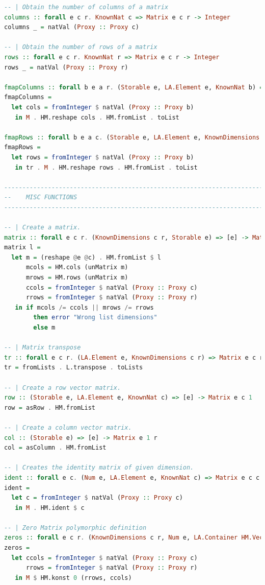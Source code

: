 \documentclass[
  oneside,
  11pt, a4paper,
  footinclude=true,
  headinclude=true,
  cleardoublepage=empty
]{scrbook}
\theoremstyle{definition}
\theoremstyle{definition}
\begin{document}
\begin{lstlisting}[language=Haskell, caption={Type safe matrix wrapper library},captionpos=b]
-- | Obtain the number of columns of a matrix
columns :: forall e c r. KnownNat c => Matrix e c r -> Integer
columns _ = natVal (Proxy :: Proxy c)

-- | Obtain the number of rows of a matrix
rows :: forall e c r. KnownNat r => Matrix e c r -> Integer
rows _ = natVal (Proxy :: Proxy r)

fmapColumns :: forall b e a r. (Storable e, LA.Element e, KnownNat b) => Matrix e a r -> Matrix e b r
fmapColumns =
  let cols = fromInteger $ natVal (Proxy :: Proxy b)
   in M . HM.reshape cols . HM.fromList . toList

fmapRows :: forall b e a c. (Storable e, LA.Element e, KnownDimensions c b) => Matrix e c a -> Matrix e c b
fmapRows =
  let rows = fromInteger $ natVal (Proxy :: Proxy b)
   in tr . M . HM.reshape rows . HM.fromList . toList

-------------------------------------------------------------------------------
--    MISC FUNCTIONS
-------------------------------------------------------------------------------

-- | Create a matrix.
matrix :: forall e c r. (KnownDimensions c r, Storable e) => [e] -> Matrix e c r
matrix l =
  let m = (reshape @e @c) . HM.fromList $ l
      mcols = HM.cols (unMatrix m)
      mrows = HM.rows (unMatrix m)
      ccols = fromInteger $ natVal (Proxy :: Proxy c)
      rrows = fromInteger $ natVal (Proxy :: Proxy r)
   in if mcols /= ccols || mrows /= rrows
        then error "Wrong list dimensions"
        else m

-- | Matrix transpose
tr :: forall e c r. (LA.Element e, KnownDimensions c r) => Matrix e c r -> Matrix e r c
tr = fromLists . L.transpose . toLists

-- | Create a row vector matrix.
row :: (Storable e, LA.Element e, KnownNat c) => [e] -> Matrix e c 1
row = asRow . HM.fromList

-- | Create a column vector matrix.
col :: (Storable e) => [e] -> Matrix e 1 r
col = asColumn . HM.fromList

-- | Creates the identity matrix of given dimension.
ident :: forall e c. (Num e, LA.Element e, KnownNat c) => Matrix e c c
ident =
  let c = fromInteger $ natVal (Proxy :: Proxy c)
   in M . HM.ident $ c

-- | Zero Matrix polymorphic definition
zeros :: forall e c r. (KnownDimensions c r, Num e, LA.Container HM.Vector e) => Matrix e c r
zeros =
  let ccols = fromInteger $ natVal (Proxy :: Proxy c)
      rrows = fromInteger $ natVal (Proxy :: Proxy r)
   in M $ HM.konst 0 (rrows, ccols)


\end{lstlisting}
\end{document}

